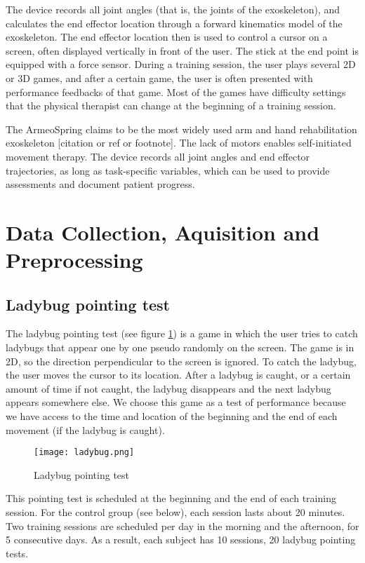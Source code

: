 The device records all joint angles (that is, the joints of the exoskeleton), and calculates the end effector location through a forward kinematics model of the exoskeleton. The end effector location then is used to control a cursor on a screen, often displayed vertically in front of the user. The stick at the end point is equipped with a force sensor. During a training session, the user plays several 2D or 3D games, and after a certain game, the user is often presented with performance feedbacks of that game. Most of the games have difficulty settings that the physical therapist can change at the beginning of a training session.

The ArmeoSpring claims to be the most widely used arm and hand rehabilitation exoskeleton [citation or ref or footnote]. The lack of motors enables self-initiated movement therapy. The device records all joint angles and end effector trajectories, as long as task-specific variables, which can be used to provide assessments and document patient progress.

\section{Data Collection, Aquisition and Preprocessing}
\label{datacollect}


\subsection{Ladybug pointing test}

The ladybug pointing test (see figure \ref{fig:ladybug}) is a game in which the user tries to catch ladybugs that appear one by one pseudo randomly on the screen. The game is in 2D, so the direction perpendicular to the screen is ignored. To catch the ladybug, the user moves the cursor to its location. After a ladybug is caught, or a certain amount of time if not caught, the ladybug disappears and the next ladybug appears somewhere else. We choose this game as a test of performance because we have access to the time and location of the beginning and the end of each movement (if the ladybug is caught).%

\begin{figure}
	\texttt{[image: ladybug.png]}
	\centering
	\caption{Ladybug pointing test}
	\label{fig:ladybug}
\end{figure}

This pointing test is scheduled at the beginning and the end of each training session. For the control group (see below), each session lasts about 20 minutes. Two training sessions are scheduled per day in the morning and the afternoon, for 5 consecutive days. As a result, each subject has 10 sessions, 20 ladybug pointing tests. 

